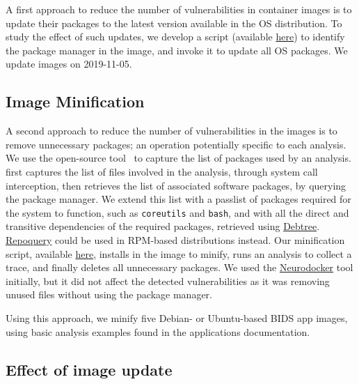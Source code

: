 A first approach to reduce the number of vulnerabilities in container
images is to update their packages to the latest version available in the OS
distribution. To study the effect of such updates, we develop a script
(available
\href{https://github.com/big-data-lab-team/container-vulnerabilities-paper/blob/master/Scripts/update}{here})
to identify the package manager in the image, and invoke it to update all
OS packages. We update images on 2019-11-05.

\subsection{Image Minification}

A second approach to reduce the number of vulnerabilities in the images is
to remove unnecessary packages; an operation potentially specific to each
analysis. We use the open-source \reprozip tool~\cite{rampin2016reprozip}
to capture the list of packages used by an analysis. \reprozip first
captures the list of files involved in the analysis, through system call
interception, then retrieves the list of associated software packages, by
querying the package manager. We extend this list with a passlist of
packages required for the system to function, such as \texttt{coreutils}
and \texttt{bash}, and with all the direct and transitive dependencies of the required packages,
retrieved using
\href{http://manpages.ubuntu.com/manpages/xenial/man1/debtree.1.html}{Debtree}.
\href{https://linux.die.net/man/1/repoquery}{Repoquery} could be used in
RPM-based distributions instead. Our minification script, available
\href{https://github.com/big-data-lab-team/container-vulnerabilities-paper/tree/master/Scripts/minification}{here},
installs \reprozip in the image to minify, runs an analysis to collect a
\reprozip trace, and finally deletes all unnecessary packages. We used
the \href{https://github.com/ReproNim/neurodocker}{Neurodocker} tool
initially, but it did not affect the detected vulnerabilities
as it was removing unused files without using the package manager.

Using this approach, we minify five Debian- or Ubuntu-based BIDS app images,
using basic analysis examples found in the applications documentation.

\subsection{Effect of image update}

